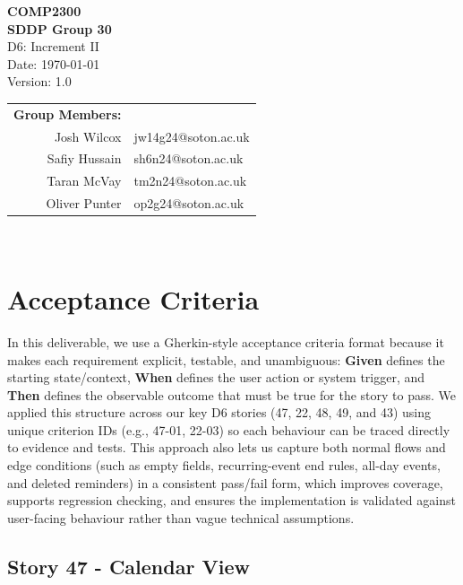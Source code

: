 \documentclass[a4paper,12pt]{article}
\begin{document}
\pagestyle{empty}

\begin{titlepage}
    \centering
    \vspace*{2cm}
    {\Huge \textbf{COMP2300}}\\[1cm]
    {\LARGE \textbf{SDDP Group 30}}\\[0.5cm]
    {\Large D6: Increment II}\\[1cm]
    {\large Date: \today}\\[0.2cm]
    {\large Version: 1.0}\\[1cm]
    \begin{tabular}{rl}
        \textbf{Group Members:} & \\
        Josh Wilcox & jw14g24@soton.ac.uk \\
        Safiy Hussain & sh6n24@soton.ac.uk \\
        Taran McVay & tm2n24@soton.ac.uk \\
        Oliver Punter & op2g24@soton.ac.uk \\
    \end{tabular} \\[0.2cm]
    \vfill 

\end{titlepage}

\section{Acceptance Criteria}

In this deliverable, we use a Gherkin-style acceptance criteria format because it makes each requirement explicit, testable, and unambiguous: \textbf{Given} defines the starting state/context, \textbf{When} defines the user action or system trigger, and \textbf{Then} defines the observable outcome that must be true for the story to pass. We applied this structure across our key D6 stories (47, 22, 48, 49, and 43) using unique criterion IDs (e.g., 47-01, 22-03) so each behaviour can be traced directly to evidence and tests. This approach also lets us capture both normal flows and edge conditions (such as empty fields, recurring-event end rules, all-day events, and deleted reminders) in a consistent pass/fail form, which improves coverage, supports regression checking, and ensures the implementation is validated against user-facing behaviour rather than vague technical assumptions.


\subsection{Story 47 - Calendar View}
\end{document}

